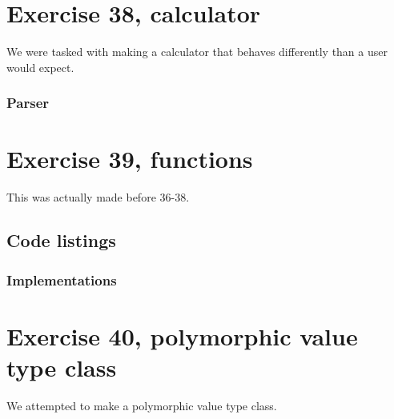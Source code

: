 \documentclass[11pt]{article}
\begin{document}
\section*{Exercise 38, calculator}
We were tasked with making a calculator that behaves differently than a user would expect.

\subsubsection*{Parser}



\section*{Exercise 39, functions}
This was actually made before 36-38.

\subsection*{Code listings}




\subsubsection*{Implementations}













\section*{Exercise 40, polymorphic value type class}
We attempted to make a polymorphic value type class.
\end{document}
